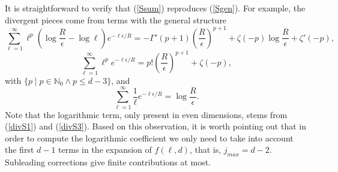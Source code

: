 \documentclass[12pt,a4paper]{article}
\begin{document}
It is straightforward to verify that (\ref{Ssum}) reproduces (\ref{Sgen}). For example, the divergent pieces come from terms with the general structure
\begin{equation}\label{divS1}
\sum_{\ell=1}^{\infty} \ell^p \left( \log{\frac{R}{\epsilon}}-\log{\ell}\right)e^{-\ell \epsilon/R}= -\Gamma'(p+1)\left( \frac{R}{\epsilon}\right)^{p+1}+\zeta(-p)\log{\frac{R}{\epsilon}}+\zeta'(-p),
\end{equation}
\begin{equation}\label{divS2}
\sum_{\ell=1}^{\infty} \ell^p e^{-\ell \epsilon/R}= p!\left( \frac{R}{\epsilon}\right)^{p+1}+\zeta(-p),
\end{equation}
with $\{p\mid p\in\mathbb{N}_0\wedge p\leq d-3\}$, and
\begin{equation}\label{divS3}
\sum_{\ell=1}^{\infty} \frac{1}{\ell}e^{-\ell \epsilon/R}= \log{\frac{R}{\epsilon}}.
\end{equation}
Note that the logarithmic term, only present in even dimensions, stems from (\ref{divS1}) and (\ref{divS3}). Based on this observation, it is worth pointing out that in order to compute the logarithmic coefficient we only need to take into account the first $d-1$ terms in the expansion of $f(\ell,d)$, that is, $j_{max}=d-2$. Subleading corrections give finite contributions at most.
\end{document}
